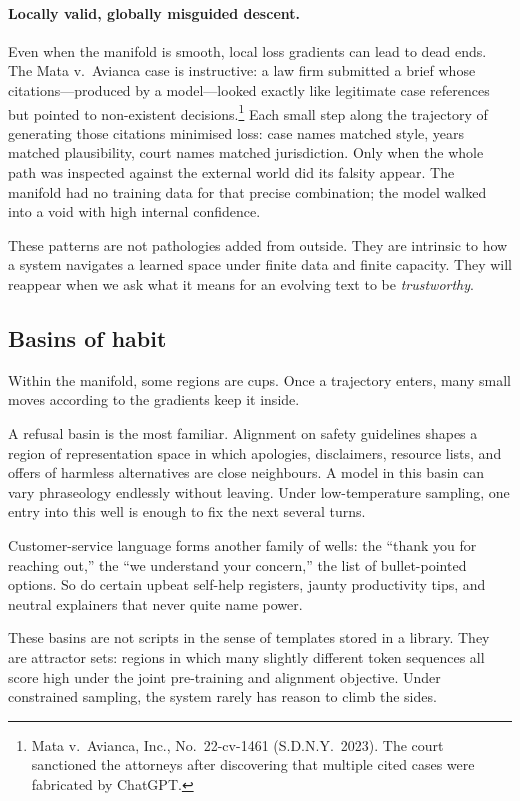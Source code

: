 \documentclass[12pt,a4paper]{book}
\begin{document}
\paragraph{Locally valid, globally misguided descent.} Even when the manifold is smooth, local loss gradients can lead to dead ends. The Mata v.\ Avianca case is instructive: a law firm submitted a brief whose citations---produced by a model---looked exactly like legitimate case references but pointed to non-existent decisions.\footnote{Mata v.\ Avianca, Inc., No.\ 22-cv-1461 (S.D.N.Y.\ 2023). The court sanctioned the attorneys after discovering that multiple cited cases were fabricated by ChatGPT.} Each small step along the trajectory of generating those citations minimised loss: case names matched style, years matched plausibility, court names matched jurisdiction. Only when the whole path was inspected against the external world did its falsity appear. The manifold had no training data for that precise combination; the model walked into a void with high internal confidence.

These patterns are not pathologies added from outside. They are intrinsic to how a system navigates a learned space under finite data and finite capacity. They will reappear when we ask what it means for an evolving text to be \emph{trustworthy}.

\subsection*{Basins of habit}

Within the manifold, some regions are cups. Once a trajectory enters, many small moves according to the gradients keep it inside.

A refusal basin is the most familiar. Alignment on safety guidelines shapes a region of representation space in which apologies, disclaimers, resource lists, and offers of harmless alternatives are close neighbours. A model in this basin can vary phraseology endlessly without leaving. Under low-temperature sampling, one entry into this well is enough to fix the next several turns.

Customer-service language forms another family of wells: the ``thank you for reaching out,'' the ``we understand your concern,'' the list of bullet-pointed options. So do certain upbeat self-help registers, jaunty productivity tips, and neutral explainers that never quite name power.

These basins are not scripts in the sense of templates stored in a library. They are attractor sets: regions in which many slightly different token sequences all score high under the joint pre-training and alignment objective. Under constrained sampling, the system rarely has reason to climb the sides.
\end{document}
